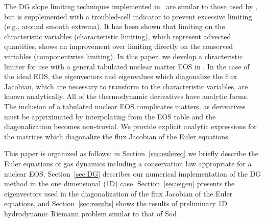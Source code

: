 \documentclass[onecolumn]{aastex62}
\begin{document}
The DG slope limiting techniques implemented in \thornado\, are similar to those
used by \cite{schaal:2015a}, but is supplemented with a troubled-cell
indicator \citep{fu:2017} to prevent excessive limiting (e.g., around smooth extrema).
It has been shown \citep[see e.g.,][]{schaal:2015a, cockburn:1998, cockburn:1989}
that limiting on the chracteristic variables (characteristic limiting),
which represent advected quantities, shows an improvement over limiting
directly on the conserved variables (componentwise limiting).
In this paper, we develop a chracteristic
limiter for use with a general tabulated nuclear matter EOS in \thornado.
In the case of the ideal EOS, the eigenvectors and eigenvalues which diagonalize
the flux Jacobian, which are necessary to transform to the characteristic variables,
are known analytically. All of the thermodynamic derivatives have analytic forms.
The inclusion of a tabulated nuclear EOS complicates matters, as derivatives
must be appriximated by interpolating from the EOS table and the diagonalization
becomes non-trovial.
We provide explicit analytic expressions for the matrices which diagonalize the
flux Jacobian of the Euler equations.

This paper is organized as follows: in Section~\ref{sec:eulereq} we briefly
describe the Euler equations of gas dynamics including a conservation law
appropriate for a nuclear EOS. Section~\ref{sec:DG} describes our
numerical implementation of the DG method in the one dimensional (1D) case.
Section~\ref{sec:eigen} presents the eigenvectors used in the diagonalization
of the flux Jacobian of the Euler equations, and Section~\ref{sec:results}
shows the results of preliminary 1D hydrodynamic Riemann problem similar to that
of Sod \citep{sod:1978}.
\end{document}
